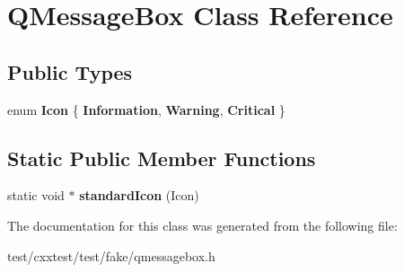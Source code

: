 \hypertarget{classQMessageBox}{\section{Q\-Message\-Box Class Reference}
\label{classQMessageBox}
}
\subsection*{Public Types}
\begin{DoxyCompactItemize}
\item 
enum {\bfseries Icon} \{ {\bfseries Information}, 
{\bfseries Warning}, 
{\bfseries Critical}
 \}
\end{DoxyCompactItemize}
\subsection*{Static Public Member Functions}
\begin{DoxyCompactItemize}
\item 
\hypertarget{classQMessageBox_a8879bc60eba0a0646149790f0ec8e820}{static void $\ast$ {\bfseries standard\-Icon} (Icon)}\label{classQMessageBox_a8879bc60eba0a0646149790f0ec8e820}

\end{DoxyCompactItemize}


The documentation for this class was generated from the following file\-:\begin{DoxyCompactItemize}
\item 
test/cxxtest/test/fake/qmessagebox.\-h\end{DoxyCompactItemize}
